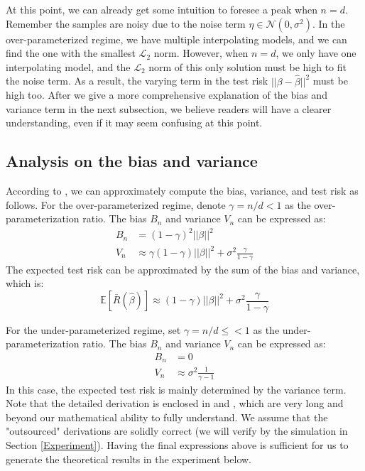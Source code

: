 \documentclass{article}
\begin{document}
At this point, we can already get some intuition to foresee a peak when $n = d$. Remember the samples are noisy due to the noise term $\eta \in \mathcal{N}(0, \sigma^2)$. In the over-parameterized regime, we have multiple interpolating models, and we can find the one with the smallest $\mathcal{L}_2$ norm. However, when $n = d$, we only have one interpolating model, and the $\mathcal{L}_2$ norm of this only solution must be high to fit the noise term. As a result, the varying term in the test risk $||\beta - \hat{\beta}||^2$ must be high too. After we give a more comprehensive explanation of the bias and variance term in the next subsection, we believe readers will have a clearer understanding, even if it may seem confusing at this point. 

\subsection{Analysis on the bias and variance}\label{analysis}
According to \cite{nakkiran2021deep}, we can approximately compute the bias, variance, and test risk as follows. For the over-parameterized regime, denote $\gamma = n/d < 1$ as the over-parameterization ratio. The bias $B_n$ and variance $V_n$ can be expressed as:
\begin{align} 
	B_n &= (1 - \gamma)^2||\beta||^2\\ 
	V_n &\approx \gamma (1-\gamma)||\beta||^2 + \sigma^2\frac{\gamma}{1-\gamma}
\end{align}
The expected test risk can be approximated by the sum of the bias and variance, which is:
\begin{equation}
	\mathbb{E}[\bar{R}(\hat{\beta})] \approx (1-\gamma)||\beta||^2 + \sigma^2\frac{\gamma}{1-\gamma}
\end{equation}

For the under-parameterized regime, set $\gamma = n/d\leq< 1$ as the under-parameterization ratio. The bias $B_n$ and variance $V_n$ can be expressed as:
\begin{align} 
	B_n &= 0\\ 
	V_n &\approx \sigma^2\frac{1}{\gamma - 1}
\end{align}
In this case, the expected test risk is mainly determined by the variance term. Note that the detailed derivation is enclosed in \cite{nakkiran2021deep} and \cite{hastie2022surprises}, which are very long and beyond our mathematical ability to fully understand. We assume that the "outsourced" derivations are solidly correct (we will verify by the simulation in Section \ref{Experiment}). Having the final expressions above is sufficient for us to generate the theoretical results in the experiment below.
\end{document}
